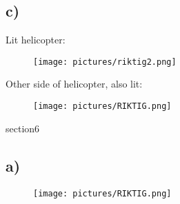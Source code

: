 \documentclass{article}
\begin{document}
\subsection{c)}
Lit helicopter:
\begin{figure}[h]
    \centering
    \texttt{[image: pictures/riktig2.png]}
\end{figure}
\FloatBarrier
Other side of helicopter, also lit:
\begin{figure}[h]
    \centering
    \texttt{[image: pictures/RIKTIG.png]}
\end{figure}

section{6}
\subsection{a)}
\begin{figure}[h]
    \centering
    \texttt{[image: pictures/RIKTIG.png]}
\end{figure}
\end{document}
